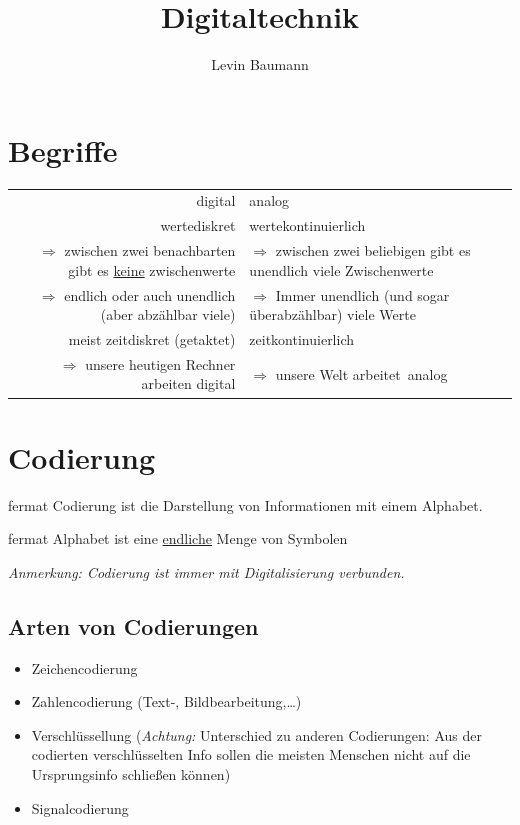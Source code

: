 \documentclass[10pt,a4paper]{scrartcl}
\author{Levin Baumann}
\title{Digitaltechnik}
\begin{document}
	\maketitle
	\section{Begriffe}
	\begin{tabular}{r|l}
		digital & analog \\
		wertediskret & wertekontinuierlich\\
		$\Rightarrow$ zwischen zwei benachbarten gibt es \underline{keine} zwischenwerte & $\Rightarrow$ zwischen zwei beliebigen gibt es unendlich viele Zwischenwerte \\
		$ \Rightarrow $ endlich oder auch unendlich (aber abzählbar viele) & $ \Rightarrow $ Immer unendlich (und sogar überabzählbar) viele Werte \\
		meist zeitdiskret (\glqq getaktet\grqq) & zeitkontinuierlich \\
		$ \Rightarrow $ unsere heutigen Rechner arbeiten digital & $ \Rightarrow $ unsere Welt \glqq arbeitet\grqq\ analog
	\end{tabular}

\section{Codierung}

	\begin{Theorem}{}{fermat}
		Codierung ist die Darstellung von Informationen mit einem \glqq Alphabet\grqq.
	\end{Theorem}
		
	\begin{Theorem}{}{fermat}
		Alphabet ist eine \underline{endliche} Menge von Symbolen
	\end{Theorem}
	
	\textit{Anmerkung: Codierung ist immer mit Digitalisierung verbunden.} \\
	
	\subsection{Arten von Codierungen}
	\begin{itemize}
		\item Zeichencodierung
		\item Zahlencodierung (Text-, Bildbearbeitung,\dots)
		\item Verschlüssellung (\textit{Achtung:} Unterschied zu anderen Codierungen: Aus der codierten verschlüsselten Info sollen die meisten Menschen nicht auf die Ursprungsinfo schließen können)
		\item Signalcodierung
	\end{itemize}
\end{document}
